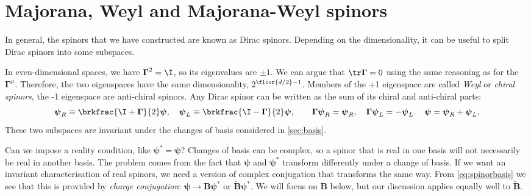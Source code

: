 \documentclass[11pt]{article}
\newcommand{\Gammab}{\boldsymbol{\Gamma}}
\newcommand{\B}{\mathbf{B}}
\newcommand{\Bt}{\widetilde{\mathbf{B}}}
\newcommand{\psib}{\boldsymbol{\psi}}
\begin{document}
\section{Majorana, Weyl and Majorana-Weyl spinors}\label{sec:majoranaweyl}

In general, the spinors that we have constructed are known as Dirac spinors.
Depending on the dimensionality, it can be useful to split Dirac spinors into some subspaces.

In even-dimensional spaces, we have $\Gammab^2 = \I$, so its eigenvalues are $\pm 1$.
We can argue that $\tr \Gammab = 0$ using the same reasoning as for the $\Gammab^\mu$.
Therefore, the two eigenspaces have the same dimensionality, $2^{\floor{d/2}-1}$.
Members of the +1 eigenspace are called \emph{Weyl} or \emph{chiral spinors}, the -1 eigenspace are anti-chiral spinors.
Any Dirac spinor can be written as the sum of its chiral and anti-chiral parts:
%
\begin{equation}\label{eq:Weylanti}
  \psib_R \equiv \brkfrac{\I+\Gammab}{2} \psib,
  \quad
  \psib_L \equiv \brkfrac{\I-\Gammab}{2} \psib,
  \qquad
  \Gammab \psib_R = \psib_R,
  \quad
  \Gammab \psib_L = - \psib_L.
  \quad
  \psib = \psib_R + \psib_L,
\end{equation}
%
These two subspaces are invariant under the changes of basis considered in \cref{sec:basis}.

Can we impose a reality condition, like $\psib^\ast = \psib$?
Changes of basis can be complex, so a spinor that is real in one basis will not necessarily be real in another basis.
The problem comes from the fact that $\psib$ and $\psib^\ast$ transform differently under a change of basis.
If we want an invariant characterisation of real spinors, we need a version of complex conjugation that transforms the same way.
From \cref{eq:spinorbasis} we see that this is provided by \emph{charge conjugation}: \( \psib \to \B \psib^\ast \) or \( \Bt \psib^\ast \).
We will focus on $\B$ below, but our discussion applies equally well to $\Bt$.
\end{document}
